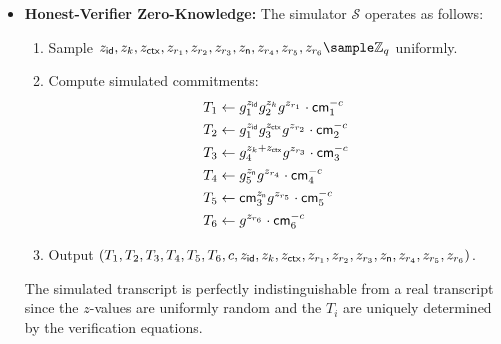 \begin{itemize}
    \item \textbf{Honest-Verifier Zero-Knowledge:} The simulator $\mathcal{S}$ operates as follows:
    \begin{enumerate}
        \item Sample $z_{\id}, z_k, z_{\ctx}, z_{r_1}, z_{r_2}, z_{r_3}, z_{\textsf{n}}, z_{r_4}, z_{r_5}, z_{r_6} \sample \mathbb{Z}_q$ uniformly.
        \item Compute simulated commitments:
        \begin{align*}
            T_1 &\gets g_1^{z_{\mathsf{id}}} g_2^{z_k} g^{z_{r_1}} \cdot \mathsf{cm}_1^{-c} \\
            T_2 &\gets g_1^{z_{\mathsf{id}}} g_3^{z_{\mathsf{ctx}}} g^{z_{r_2}} \cdot \mathsf{cm}_2^{-c} \\
            T_3 &\gets g_4^{z_k + z_{\mathsf{ctx}}} g^{z_{r_3}} \cdot \mathsf{cm}_3^{-c} \\
            T_4 &\gets g_5^{z_{\textsf{n}}} g^{z_{r_4}} \cdot \mathsf{cm}_4^{-c} \\
            T_5 &\gets \mathsf{cm}_3^{z_{\textsf{n}}} g^{z_{r_5}} \cdot \mathsf{cm}_5^{-c} \\
            T_6 &\gets g^{z_{r_6}} \cdot \mathsf{cm}_6^{-c}
        \end{align*}
        \item Output $(T_1, T_2, T_3, T_4, T_5, T_6, c, z_{\mathsf{id}}, z_k, z_{\mathsf{ctx}}, z_{r_1}, z_{r_2}, z_{r_3}, z_{\textsf{n}}, z_{r_4}, z_{r_5}, z_{r_6})$.
    \end{enumerate}
    The simulated transcript is perfectly indistinguishable from a real transcript since the $z$-values are uniformly random and the $T_i$ are uniquely determined by the verification equations.
\end{itemize}

